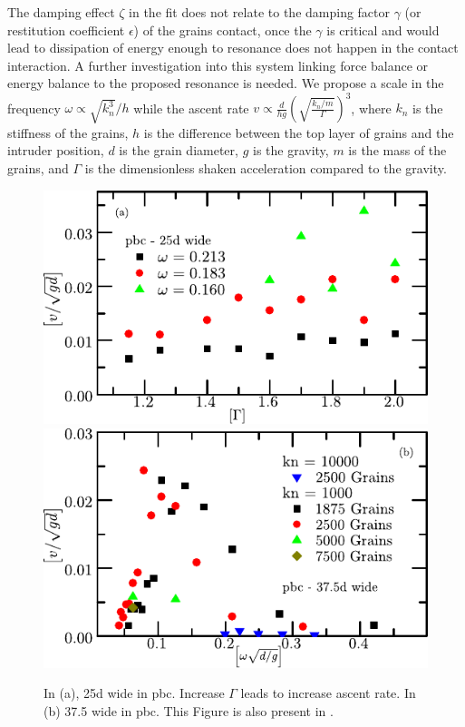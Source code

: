     The damping effect $\zeta$ in the fit does not relate to the damping factor $\gamma$ (or restitution coefficient $\epsilon$) of the grains contact, once the $\gamma$ is critical and would lead to dissipation of energy enough to resonance does not happen in the contact interaction. A further investigation into this system linking force balance or energy balance to the proposed resonance is needed. We propose a scale in the frequency $\omega \propto \sqrt{k_n^3}/h$ while the ascent rate $v \propto \frac{d}{h g}\left(\sqrt{\frac{k_n/m}{\Gamma}}\right)^3$, where $k_n$ is the stiffness of the grains, $h$ is the difference between the top layer of grains and the intruder position, $d$ is the grain diameter, $g$ is the gravity, $m$ is the mass of the grains, and $\Gamma$ is the dimensionless shaken acceleration compared to the gravity.

\begin{figure}[H]
    \centering
    \includegraphics[width=0.65\linewidth]{04-figuras/BNE_PBC25.pdf} \\
    \includegraphics[width=0.65\linewidth]{04-figuras/BNE_PBC37.pdf}
    \caption[BNE with periodic boundary: 25$d$ and 37.5$d$.]{In (a), 25d wide in pbc. Increase $\Gamma$ leads to increase ascent rate. In (b) 37.5 wide in pbc. This Figure is also present in \cite{Large-deviation_quantification_of_boundary_conditions_on_the_Brazil_nut_effect}.}
    \label{fig:BNE_pbc}
\end{figure}

